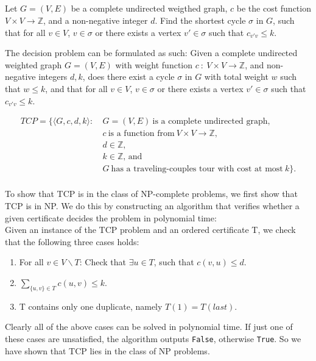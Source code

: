 \subsection{}

Let $G = (V,E)$ be a complete undirected weigthed graph, $c$ be the
cost function $V \times V \to \mathbb{Z}$, and a non-negative integer
$d$. Find the shortest cycle $\sigma$ in $G$, such that for all $v \in
V$, $v \in \sigma$ or there exists a vertex $v' \in \sigma$ such that
$c_{v'v} \leq k$.

The decision problem can be formulated as such: Given a complete
undirected weighted graph $G=(V,E)$ with weight function $c ~ : ~ V
\times V \to \mathbb{Z}$, and non-negative integers $d,k$, does there
exist a cycle $\sigma$ in $G$ with total weight $w$ such that $w \leq
k$, and that for all $v \in V$, $v \in \sigma$ or there exists a
vertex $v' \in \sigma$ such that $c_{v'v} \leq k$.

\begin{align*}
  TCP = \{ \langle G, c, d, k \rangle : ~ & G = (V,E) ~ \text{is a complete
    undirected graph}, \\
  & c ~ \text{is a function from} ~ V \times V \to \mathbb{Z}, \\
  & d \in \mathbb{Z}, \\ 
  & k \in \mathbb{Z} \textrm{, and} \\
  & G ~\text{has a traveling-couples tour with cost at most} ~ k\} .\\
\end{align*}

To show that TCP is in the class of NP-complete problems, we first show that
TCP is in NP. We do this by constructing an algorithm that verifies whether a
given certificate decides the problem in polynomial time:\\

Given an instance of the TCP problem and an ordered certificate T, we check
that the following three cases holds:

\begin{enumerate}
  \item {For all $v \in V\backslash T$: Check that $\exists u \in T$, such
  that $c(v,u) \leq d$.}
  \item {$\sum_{\{u,v\} \in T} c(u,v) \leq k$.}
  \item {T contains only one duplicate, namely $T(1) = T(last)$.}
\end{enumerate}

Clearly all of the above cases can be solved in polynomial time. If just
one of these cases are unsatisfied, the algorithm outputs \texttt{False},
otherwise \texttt{True}. So we have shown that TCP lies in the class of NP
problems.\\

